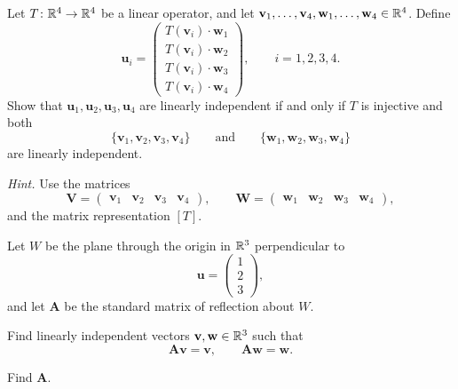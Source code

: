 \documentclass[11pt,oneside]{article}
\begin{document}
\begin{problem}
Let $T\colon\mathbb{R}^4\to\mathbb{R}^4$ be a linear operator, and let $\mathbf v_1,\dots,\mathbf v_4,\mathbf w_1,\dots,\mathbf w_4\in\mathbb{R}^4$. Define
\[
\mathbf u_i=
\begin{pmatrix}
T(\mathbf v_i)\cdot\mathbf w_1\\
T(\mathbf v_i)\cdot\mathbf w_2\\
T(\mathbf v_i)\cdot\mathbf w_3\\
T(\mathbf v_i)\cdot\mathbf w_4
\end{pmatrix},
\qquad i=1,2,3,4.
\]
Show that $\mathbf u_1,\mathbf u_2,\mathbf u_3,\mathbf u_4$ are linearly independent if and only if $T$ is injective and both
\[
\{\mathbf v_1,\mathbf v_2,\mathbf v_3,\mathbf v_4\}
\qquad\text{and}\qquad
\{\mathbf w_1,\mathbf w_2,\mathbf w_3,\mathbf w_4\}
\]
are linearly independent.

\textit{Hint.} Use the matrices
\[
\mathbf V=\begin{pmatrix}\mathbf v_1&\mathbf v_2&\mathbf v_3&\mathbf v_4\end{pmatrix},
\qquad
\mathbf W=\begin{pmatrix}\mathbf w_1&\mathbf w_2&\mathbf w_3&\mathbf w_4\end{pmatrix},
\]
and the matrix representation $[T]$.
\end{problem}

\begin{problem}
Let $W$ be the plane through the origin in $\mathbb{R}^3$ perpendicular to
\[
\mathbf u=
\begin{pmatrix}
1\\2\\3
\end{pmatrix},
\]
and let $\mathbf A$ be the standard matrix of reflection about $W$.
\begin{problemsubparts}
\item Find linearly independent vectors $\mathbf v,\mathbf w\in\mathbb{R}^3$ such that
\[
\mathbf A\mathbf v=\mathbf v,
\qquad
\mathbf A\mathbf w=\mathbf w.
\]
\item Find $\mathbf A$.
\end{problemsubparts}
\end{problem}
\end{document}

